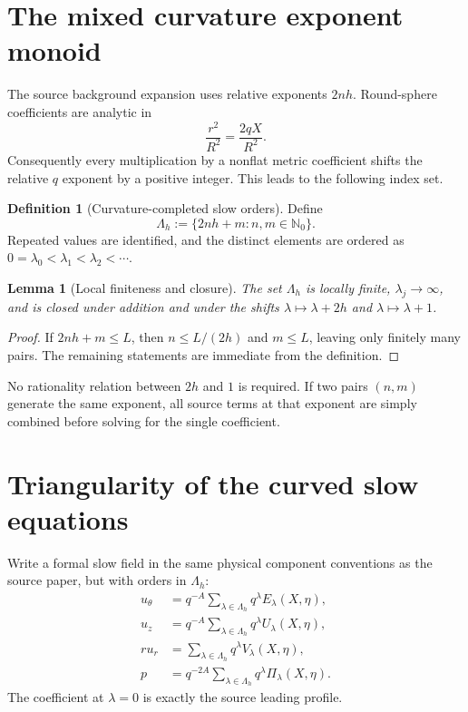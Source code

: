 \documentclass[aps,prd,reprint,superscriptaddress,nofootinbib,floatfix]{revtex4-2}
\newtheorem{lemma}[theorem]{Lemma}
\theoremstyle{definition}
\newtheorem{definition}[theorem]{Definition}
\theoremstyle{remark}
\newcommand{\Lam}{\Lambda_h}
\begin{document}
\section{The mixed curvature exponent monoid}\label{sec:monoid}

The source background expansion uses relative exponents $2nh$. Round-sphere coefficients are analytic in
\begin{equation}
	\frac{r^2}{R^2}=\frac{2qX}{R^2}.
\end{equation}
Consequently every multiplication by a nonflat metric coefficient shifts the relative $q$ exponent by a positive integer. This leads to the following index set.

\begin{definition}[Curvature-completed slow orders]\label{def:monoid}
	Define
	\begin{equation}
		\Lam:=\{2nh+m:n,m\in\mathbb N_0\}.
		\label{eq:monoid}
	\end{equation}
	Repeated values are identified, and the distinct elements are ordered as
	$0=\lambda_0<\lambda_1<\lambda_2<\cdots$.
\end{definition}

\begin{lemma}[Local finiteness and closure]\label{lem:monoid}
	The set $\Lam$ is locally finite, $\lambda_j\to\infty$, and is closed under addition and under the shifts $\lambda\mapsto\lambda+2h$ and $\lambda\mapsto\lambda+1$.
\end{lemma}

\begin{proof}
	If $2nh+m\le L$, then $n\le L/(2h)$ and $m\le L$, leaving only finitely many pairs. The remaining statements are immediate from the definition.
\end{proof}

No rationality relation between $2h$ and $1$ is required. If two pairs $(n,m)$ generate the same exponent, all source terms at that exponent are simply combined before solving for the single coefficient.


\section{Triangularity of the curved slow equations}\label{sec:triangular}

Write a formal slow field in the same physical component conventions as the source paper, but with orders in $\Lam$:
\begin{align}
	u_\theta & =q^{-A}\sum_{\lambda\in\Lam}q^\lambda E_\lambda(X,\eta),\nonumber \\
	u_z      & =q^{-A}\sum_{\lambda\in\Lam}q^\lambda U_\lambda(X,\eta),\nonumber \\
	r u_r    & =\sum_{\lambda\in\Lam}q^\lambda V_\lambda(X,\eta),\nonumber       \\
	p        & =q^{-2A}\sum_{\lambda\in\Lam}q^\lambda\Pi_\lambda(X,\eta).
	\label{eq:mixedseries}
\end{align}
The coefficient at $\lambda=0$ is exactly the source leading profile.
\end{document}
